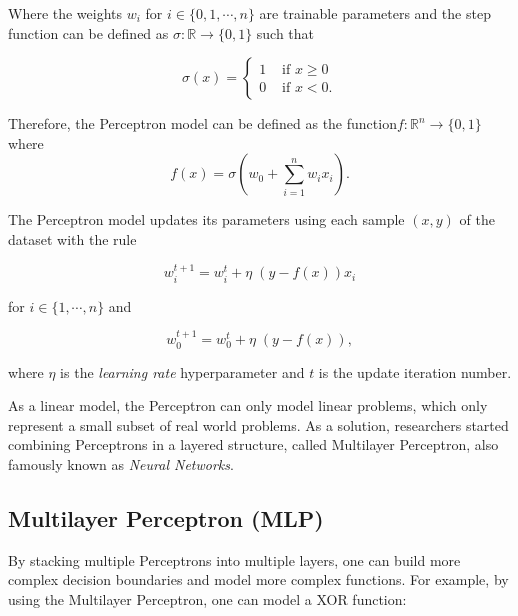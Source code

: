 Where the weights \(w_i\) for \(i \in \{0, 1, \cdots, n\}\) are trainable parameters and the step function can be defined as \(\sigma \colon \mathbb{R} \to \{0, 1\}\) such that

\begin{equation}
    \sigma(x) = 
    \begin{cases}
        1 & \text{ if } x \geq 0 \\
        0 & \text{ if } x < 0.
    \end{cases}
    \label{eq:step_function_perceptron}    
\end{equation}

Therefore, the Perceptron model can be defined as the function\footnotemark \(f \colon \mathbb{R}^n \to \{0, 1\}\) where
\begin{equation}
    f(x) = \sigma(w_0 + \sum_{i = 1}^{n} w_i x_i).
    \label{eq:perceptron}
\end{equation}

The Perceptron model updates its parameters using each sample \((x, y)\) of the dataset with the rule

\begin{equation}
    w_i^{t + 1} = w_i^t + \eta \; (y - f(x)) x_i
    \label{eq:perceptron_update}  
\end{equation}

\noindent for \(i \in \{1, \cdots, n\}\) and

\begin{equation}
    w_0^{t + 1} = w_0^t + \eta \; (y - f(x)),  
\end{equation}

\noindent where \(\eta\) is the \emph{learning rate} hyperparameter and \(t\) is the update iteration number.

As a linear model, the Perceptron can only model linear problems, which only represent a small subset of real world problems.
As a solution, researchers started combining Perceptrons in a layered structure, called Multilayer Perceptron, also famously known as \emph{Neural Networks}.

\subsection{Multilayer Perceptron (MLP)}

By stacking multiple Perceptrons into multiple layers, one can build more complex decision boundaries and model more complex functions. 
For example, by using the Multilayer Perceptron, one can model a XOR function: 

